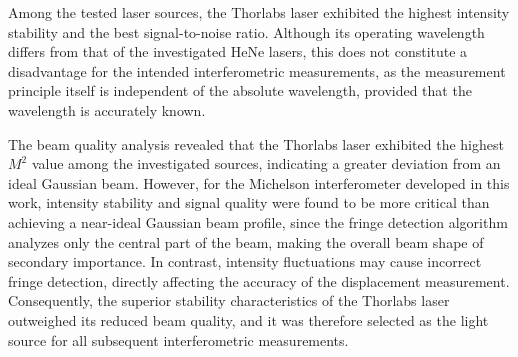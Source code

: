 Among the tested laser sources, the Thorlabs laser exhibited the highest intensity stability and the best signal-to-noise ratio. Although its operating wavelength differs from that of the investigated HeNe lasers, this does not constitute a disadvantage for the intended interferometric measurements, as the measurement principle itself is independent of the absolute wavelength, provided that the wavelength is accurately known.

The beam quality analysis revealed that the Thorlabs laser exhibited the highest \(M^2\) value among the investigated sources, indicating a greater deviation from an ideal Gaussian beam. However, for the Michelson interferometer developed in this work, intensity stability and signal quality were found to be more critical than achieving a near-ideal Gaussian beam profile, since the fringe detection algorithm analyzes only the central part of the beam, making the overall beam shape of secondary importance. In contrast, intensity fluctuations may cause incorrect fringe detection, directly affecting the accuracy of the displacement measurement. Consequently, the superior stability characteristics of the Thorlabs laser outweighed its reduced beam quality, and it was therefore selected as the light source for all subsequent interferometric measurements.